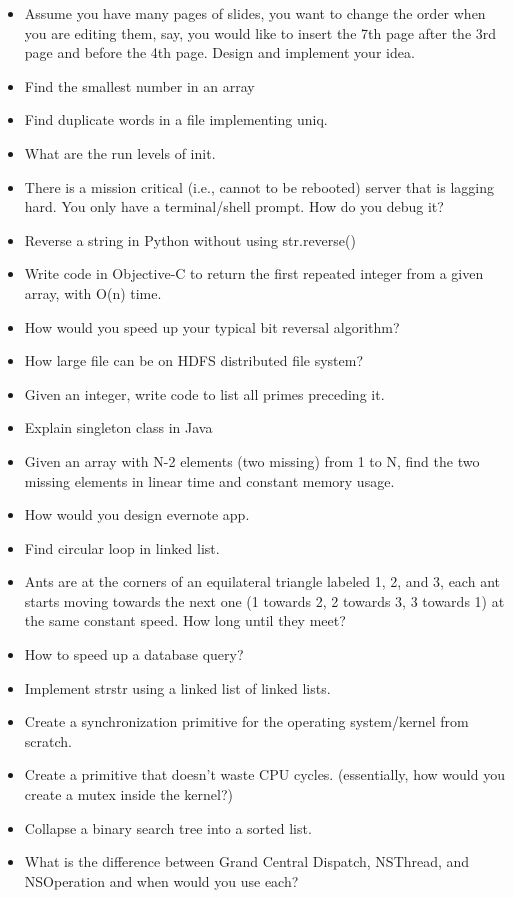 \documentclass{article}
\begin{document}
\begin{itemize}
	\item Assume you have many pages of slides, you want to change the order when you are editing them, say, you would like to insert the 7th page after the 3rd page and before the 4th page. Design and implement your idea.
	\item Find the smallest number in an array
	\item Find duplicate words in a file implementing uniq.
	\item What are the run levels of init.
	\item There is a mission critical (i.e., cannot to be rebooted) server that is lagging hard. You only have a terminal/shell prompt. How do you debug it?
	\item Reverse a string in Python without using str.reverse()
	\item Write code in Objective-C to return the first repeated integer from a given array, with O(n) time.
	\item How would you speed up your typical bit reversal algorithm?
	\item How large file can be on HDFS distributed file system?
	\item Given an integer, write code to list all primes preceding it.
	\item Explain singleton class in Java
	\item Given an array with N-2 elements (two missing) from 1 to N, find the two missing elements in linear time and constant memory usage.
	\item How would you design evernote app.
	\item Find circular loop in linked list.
	\item Ants are at the corners of an equilateral triangle labeled 1, 2, and 3, each ant starts moving towards the next one (1 towards 2, 2 towards 3, 3 towards 1) at the same constant speed. How long until they meet?
	\item How to speed up a database query?
	\item Implement strstr using a linked list of linked lists.
	\item Create a synchronization primitive for the operating system/kernel from scratch.
	\item Create a primitive that doesn't waste CPU cycles. (essentially, how would you create a mutex inside the kernel?)
	\item Collapse a binary search tree into a sorted list.
	\item What is the difference between Grand Central Dispatch, NSThread, and NSOperation and when would you use each?

\end{itemize}
\end{document}
